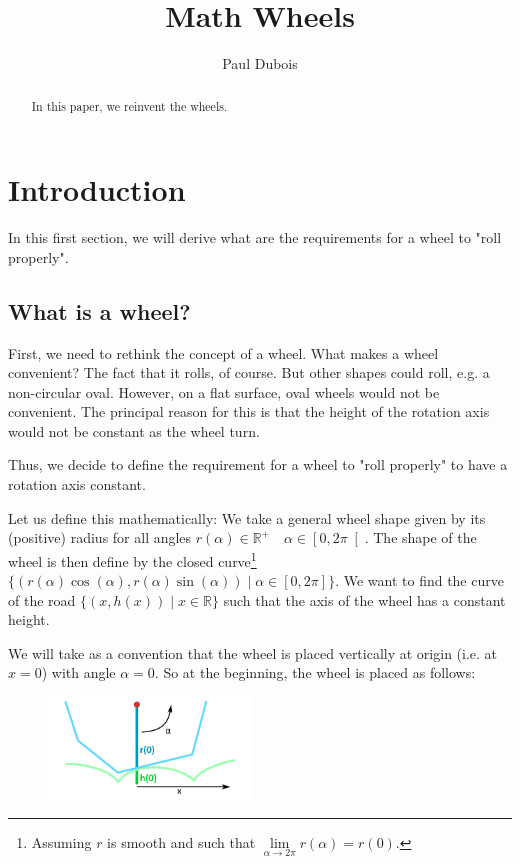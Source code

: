 \documentclass[]{article}
\title{Math Wheels}
\author{Paul Dubois}
\newcommand{\R}{\mathbb{R}}
\begin{document}
	
	\maketitle
	
	\begin{abstract}
		In this paper, we reinvent the wheels.
	\end{abstract}
	
	\section{Introduction}
	In this first section, we will derive what are the requirements for a wheel to "roll properly".
	
	\subsection{What is a wheel?}
	First, we need to rethink the concept of a wheel.
	What makes a wheel convenient? The fact that it rolls, of course. But other shapes could roll, e.g. a non-circular oval.
	However, on a flat surface, oval wheels would not be convenient.
	The principal reason for this is that the height of the rotation axis would not be constant as the wheel turn.
	
	Thus, we decide to define the requirement for a wheel to "roll properly" to have a rotation axis constant.
	
	Let us define this mathematically:
	We take a general wheel shape given by its (positive) radius for all angles $r(\alpha) \in \R^+ \quad \alpha \in \left[ 0, 2\pi \right[$.
	The shape of the wheel is then define by the closed curve\footnote{Assuming $r$ is smooth and such that $\lim\limits_{\alpha \to 2\pi} r(\alpha)=r(0)$.} $\{ (r(\alpha)\cos(\alpha),r(\alpha)\sin(\alpha)) \mid \alpha \in \left[ 0,2\pi \right] \}$.
	We want to find the curve of the road $\{ (x,h(x)) \mid x \in \R \}$ such that the axis of the wheel has a constant height.
	
	We will take as a convention that the wheel is placed vertically at origin (i.e. at $x=0$) with angle $\alpha=0$.
	So at the beginning, the wheel is placed as follows:
	
	\begin{figure}[h!] 
		\centering
		\includegraphics[height=2.7cm]{initial_position}
		\label{fig:InitialPosition}
	\end{figure}
	
\end{document}
